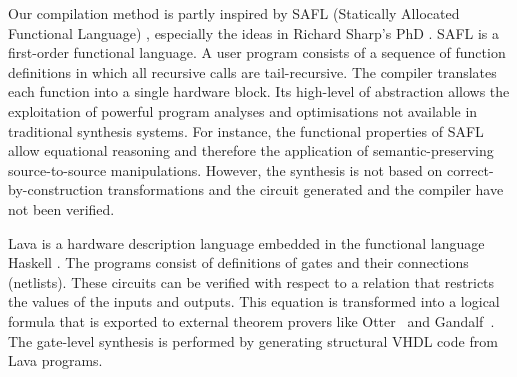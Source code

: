 


Our compilation method is partly inspired by SAFL 
(Statically Allocated Functional Language) \cite{MS01b},
especially the ideas in Richard Sharp's PhD \cite{Sha02}. 
SAFL is a first-order functional language.
A user program consists of a sequence of function 
definitions in which all recursive calls are tail-recursive.
The compiler translates each function into
a single hardware block.
Its high-level of abstraction allows
the exploitation of powerful program analyses
and optimisations not available in traditional
synthesis systems. 
For instance, the functional properties of SAFL 
allow equational reasoning and therefore the
application of semantic-preserving 
source-to-source manipulations.
However, the synthesis is not based on
correct-by-construction transformations
and the circuit generated and the compiler
have not been verified.

Lava \cite{BCSS99} is a hardware description language embedded
in the functional language Haskell \cite{Jon03}.
The programs consist of definitions
of gates and their connections (netlists).
These circuits can be verified with respect to a relation that
restricts the values of the inputs and outputs.
This equation is transformed into a logical formula that
is exported to external theorem provers like 
Otter~\cite{MW97} and Gandalf~\cite{Tam97}.
The gate-level synthesis is performed by generating
structural VHDL code from Lava programs.



